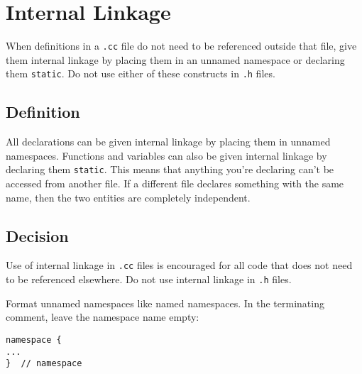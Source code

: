 

\section{Internal Linkage}\label{sec:internal-linkage}
When definitions in a \texttt{.cc} file do not need to be referenced outside that file, give them internal linkage by placing them in an unnamed namespace or declaring them \texttt{static}. Do not use either of these constructs in \texttt{.h} files.

\subsection{Definition}
All declarations can be given internal linkage by placing them in unnamed namespaces. Functions and variables can also be given internal linkage by declaring them \texttt{static}. This means that anything you're declaring can't be accessed from another file. If a different file declares something with the same name, then the two entities are completely independent.

\subsection{Decision}
Use of internal linkage in \texttt{.cc} files is encouraged for all code that does not need to be referenced elsewhere. Do not use internal linkage in \texttt{.h} files.

Format unnamed namespaces like named namespaces. In the terminating comment, leave the namespace name empty:
\begin{verbatim}
namespace {
...
}  // namespace
\end{verbatim}

